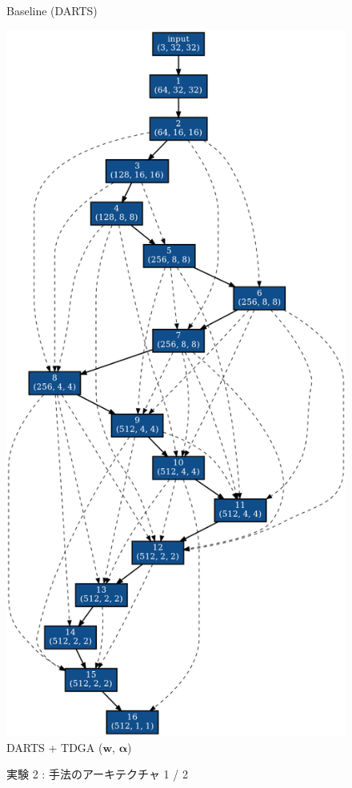 \begin{figure}[tb]
\begin{minipage}{0.49\hsize}
\begin{center}
    Baseline (DARTS)
 	\end{center}
 \end{minipage}
 \begin{minipage}{0.49\hsize}
 	\begin{center}
    \includegraphics[clip,scale=0.2]{./fig/04.exp/nofix_last.png}\\
    DARTS + TDGA ($\bm{w}$, $\bm{\alpha}$)
 	\end{center}
 \end{minipage}
 \caption{実験 2 : 手法のアーキテクチャ 1 / 2}
 \label{fig:exp2/archi}
\end{figure}

